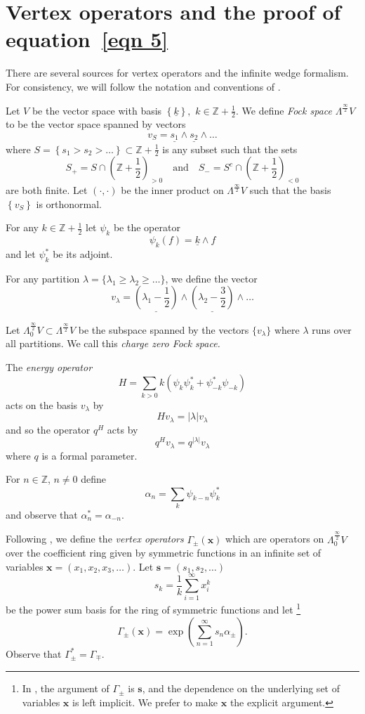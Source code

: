 \documentclass[12pt]{amsart}
\newcommand{\znums} {{\mathbb Z}}		%
\newcommand{\half}{\frac{1}{2}}
\theoremstyle{definition}
\newcommand{\FockSpace}{\Lambda^{\frac{\infty}{2}}V}
\newcommand{\FockSpaceZero}{\Lambda^{\frac{\infty}{2}}_{0}V}
\newcommand{\ZplusHalf}{\znums+{ \half}}
\begin{document}
\section{Vertex operators and the proof of equation~\eqref{eqn
5}}\label{sec: vertex ops and the pf of eqn 5}


There are several sources for vertex operators and the infinite wedge
formalism. For consistency, we will follow the notation and conventions
of \cite[Appendix~A]{Okounkov-InfWedge}.

Let $V$ be the vector space with basis $\left\{\underline{k}
\right\},$ $k\in \ZplusHalf$. We define \emph{Fock space} $\FockSpace
$ to be the vector space spanned by vectors
\[
v_{S} = \underline{s_{1}}\wedge \underline{s_{2}}\wedge \dots 
\]
where $S=\left\{s_{1}>s_{2}>\dots \right\}\subset \ZplusHalf$ is
any subset such that the sets
\[
S_{+} = S\cap \left(\ZplusHalf \right)_{>0}\quad \text{and} \quad S_{-} =
S^{c}\cap \left(\ZplusHalf \right)_{<0}
\]
are both finite. Let $(\cdot ,\cdot )$ be the inner product on
$\FockSpace$ such that the basis $\left\{v_{S} \right\}$ is
orthonormal. 

For any $k\in \ZplusHalf $ let $\psi_{k}$ be the operator
\[
\psi_{k}(f) = \underline{k}\wedge f
\]
and let $\psi^{*}_{k}$ be its adjoint.

For any partition $\lambda =\{\lambda_{1}\geq \lambda_{2}\geq \dots
\}$, we define the vector
\[
v_{\lambda}  = \underline{(\lambda_{1}-\half )}\wedge
\underline{(\lambda_{2}-\frac{3}{2})}\wedge \dots  
\]

Let $\FockSpaceZero \subset \FockSpace$ be the subspace spanned by the
vectors $\{v_{\lambda} \}$ where $\lambda$ runs over all
partitions. We call this \emph{charge zero Fock space.}

The \emph{energy operator}
\[
H=\sum_{k>0} k\left(\psi_{k}\psi_{k}^{*}+\psi_{-k}^{*}\psi_{-k} \right)
\]
acts on the basis $v_{\lambda}$ by
\[
Hv_{\lambda}  = |\lambda |v_{\lambda }
\]
and so the operator $q^{H}$ acts by
\[
q^{H}v_{\lambda} = q^{|\lambda |}v_{\lambda }
\]
where $q$ is a formal parameter.

For $n\in \znums$, $n\neq 0$ define
\[
\alpha_{n}=\sum_{k} \psi_{k-n}\psi^{*}_{k}
\]
and observe that $\alpha^{*}_{n}=\alpha_{-n}$.

Following \cite{Okounkov-InfWedge}, we define the \emph{vertex
operators} $\Gamma_{\pm}(\mathbf{x})$ which are operators on
$\FockSpaceZero$ over the coefficient ring given by symmetric
functions in an infinite set of variables $\mathbf{x} =
(x_{1},x_{2},x_{3},\dots )$. Let $\mathbf{s}=(s_{1},s_{2},\dots )$
\[
s_{k} =\frac{1}{k}\sum_{i=1}^{\infty} x_{i}^{k}
\]
be the power sum basis for the ring of symmetric functions and
let
\footnote{In \cite{Okounkov-InfWedge}, the argument of
$\Gamma_{\pm}$ is $\mathbf{s}$, and the dependence on the underlying set of
variables $\mathbf{x}$ is left implicit. We prefer to make
$\mathbf{x}$ the explicit argument.}
\[
\Gamma_{\pm}(\mathbf{x}) = \exp\left(\sum_{n=1}^{\infty}s_{n}\alpha_{\pm } \right).
\]
Observe that $\Gamma^{*}_{\pm}=\Gamma_{\mp}$.
\end{document}
